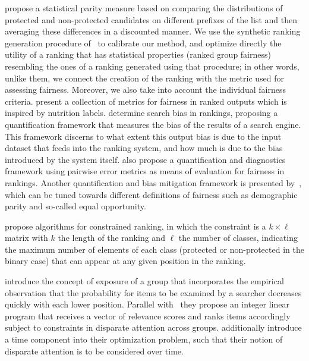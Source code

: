 \citet{yang2016measuring} propose a statistical parity measure based on comparing the distributions of protected and non-protected candidates on different prefixes of the list and then averaging these differences in a discounted manner.
%
%
%
We use the synthetic ranking generation procedure of~\citet{yang2016measuring} to calibrate our method, and optimize directly the utility of a ranking that has statistical properties (ranked group fairness) resembling the ones of a ranking generated using that procedure; in other words, unlike them, we connect the creation of the ranking with the metric used for assessing fairness.
Moreover, we also take into account the individual fairness criteria.
%
\citet{yang2018nutritional} present a collection of metrics for fairness in ranked outputs which is inspired by nutrition labels.
%
\citet{kulshrestha_2017_quantifying} determine search bias in rankings, proposing a quantification framework that measures the bias of the results of a search engine.
This framework discerns to what extent this output bias is due to the input dataset that feeds into the ranking system, and how much is due to the bias introduced by the system itself.
%
\citet{kuhlman2019fare} also propose a quantification and diagnostics framework using pairwise error metrics as means of evaluation for fairness in rankings.
%
Another quantification and bias mitigation framework is presented by~\citet{geyik2019fairness}, which can be tuned towards different definitions of fairness such as demographic parity and so-called equal opportunity.

\citet{celis2017ranking} propose algorithms for constrained ranking, in which the constraint is a $k \times \ell$ matrix with $k$ the length of the ranking and $\ell$ the number of classes, indicating the maximum number of elements of each class (protected or non-protected in the binary case) that can appear at any given position in the ranking.

\citet{singh2018fairness} introduce the concept of exposure of a group that incorporates the empirical observation that the probability for items to be examined by a searcher decreases quickly with each lower position.
%
Parallel with~\citet{biega2018equity} they propose an integer linear program that receives a vector of relevance scores and ranks items accordingly subject to constraints in disparate attention across groups. \cite{biega2018equity} additionally introduce a time component into their optimization problem, such that their notion of disparate attention is to be considered over time.

